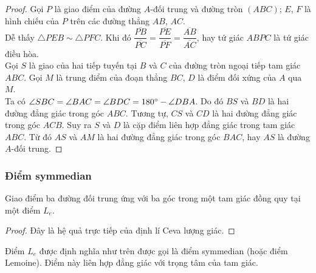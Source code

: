         \begin{proof}
            Gọi \(P\) là giao điểm của đường \(A\)-đối trung và đường tròn \((ABC)\); \(E\), \(F\) là hình chiếu của \(P\) trên các đường thẳng \(AB\), \(AC\).\\
            Dễ thấy \(\triangle PEB \sim \triangle PFC\). Khi đó \(\dfrac{\overline{PB}}{\overline{PC}} = \dfrac{\overline{PE}}{\overline{PF}} = \dfrac{\overline{AB}}{\overline{AC}}\), hay tứ giác \(ABPC\) là tứ giác điều hòa.\\
            Gọi \(S\) là giao của hai tiếp tuyến tại \(B\) và \(C\) của đường tròn ngoại tiếp tam giác \(ABC\). Gọi \(M\) là trung điểm của đoạn thẳng \(BC\), \(D\) là điểm đối xứng của \(A\) qua \(M\).\\
            Ta có \(\angle SBC = \angle BAC = \angle BDC = 180 \degree - \angle DBA\). Do đó \(BS\) và \(BD\) là hai đường đẳng giác trong góc \(ABC\). Tương tự, \(CS\) và \(CD\) là hai đường đẳng giác trong góc \(ACB\). Suy ra \(S\) và \(D\) là cặp điểm liên hợp đẳng giác trong tam giác \(ABC\). Từ đó \(AS\) và \(AM\) là hai đường đẳng giác trong góc \(BAC\), hay \(AS\) là đường \(A\)-đối trung.
        \end{proof}

    \subsubsection*{Điểm symmedian}

        \begin{theorem}
            Giao điểm ba đường đối trung ứng với ba góc trong một tam giác đồng quy tại một điểm \(L_e\). 
        \end{theorem}

        \begin{proof}
            Đây là hệ quả trực tiếp của định lí Ceva lượng giác.
        \end{proof}

        \begin{definition}
            Điểm \(L_e\) được định nghĩa như trên được gọi là điểm symmedian (hoặc điểm Lemoine). Điểm này liên hợp đẳng giác với trọng tâm của tam giác.
        \end{definition}

